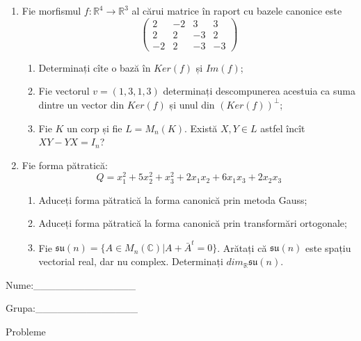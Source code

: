 \documentclass{article}
\begin{document}
\begin{enumerate}
 \item Fie morfismul $f:\mathbb{R}^4 \to \mathbb{R}^3$ al cărui matrice în raport cu bazele canonice este
$$\begin{pmatrix}
2&-2&3&3\\
2&2&-3&2\\
-2&2&-3&-3
\end{pmatrix}$$

\begin{enumerate}
\item Determinați cîte o bază în $Ker(f)$ și $Im(f)$;
\item Fie vectorul $v=(1,3,1,3)$ determinați descompunerea acestuia ca suma dintre un vector din $Ker(f)$ și unul din $(Ker(f))^\perp$;
\item Fie $K$ un corp și fie $L=M_n(K)$. Există $X,Y \in L$ astfel încît $XY-YX=I_n$?  
\end{enumerate}
\item Fie forma pătratică:
$$Q= x_1^2+5x_2^2+x_3^2+2x_1x_2+6x_1x_3+2x_2x_3$$

\begin{enumerate}
\item Aduceți forma pătratică la forma canonică prin metoda Gauss;
\item Aduceți forma pătratică la forma canonică prin transformări ortogonale;
\item Fie $\mathfrak{su}(n)=\{ A \in M_n(\mathbb{C}) | A+\bar{A}^t=0\}$. Arătați că $\mathfrak{su}(n)$ este spațiu vectorial real, dar nu complex.
Determinați $dim_{\mathbb{R}}\mathfrak{su}(n)$.
\end{enumerate}
\end{enumerate}
\newpage
\begin{flushright}
Nume:\_\_\_\_\_\_\_\_\_\_\_\_\_\_
 
 
Grupa:\_\_\_\_\_\_\_\_\_\_\_\_\_\_
\end{flushright}
\begin{center}
\vspace{2cm}
{\Large Probleme}
\vspace{2cm}
\end{center}
\end{document}
